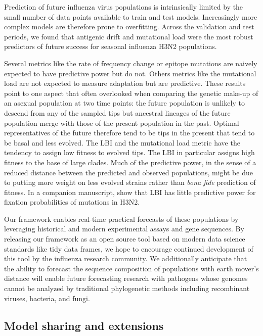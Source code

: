Prediction of future influenza virus populations is intrinsically limited by the small number of data points available to train and test models.
Increasingly more complex models are therefore prone to overfitting.
Across the validation and test periods, we found that antigenic drift and mutational load were the most robust predictors of future success for seasonal influenza H3N2 populations.

Several metrics like the rate of frequency change or epitope mutations are naively expected to have predictive power but do not.
Others metrics like the mutational load are not expected to measure adaptation but are predictive.
These results point to one aspect that often overlooked when comparing the genetic make-up of an asexual population at two time points: the future population is unlikely to descend from any of the sampled tips but ancestral lineages of the future population merge with those of the present population in the past.
Optimal representatives of the future therefore tend to be tips in the present that tend to be basal and less evolved.
The LBI and the mutational load metric have the tendency to assign low fitness to evolved tips.
The LBI in particular assigns high fitness to the base of large clades.
Much of the predictive power, in the sense of a reduced distance between the predicted and observed populations, might be due to putting more weight on less evolved strains rather than \emph{bona fide} prediction of fitness.
In a companion manuscript, \cite{Barrat-Charlaix2020} show that LBI has little predictive power for fixation probabilities of mutations in H3N2.

Our framework enables real-time practical forecasts of these populations by leveraging historical and modern experimental assays and gene sequences.
By releasing our framework as an open source tool based on modern data science standards like tidy data frames, we hope to encourage continued development of this tool by the influenza research community.
We additionally anticipate that the ability to forecast the sequence composition of populations with earth mover's distance will enable future forecasting research with pathogens whose genomes cannot be analyzed by traditional phylogenetic methods including recombinant viruses, bacteria, and fungi.

\subsection{Model sharing and extensions}

